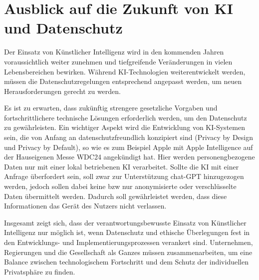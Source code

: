 \chapter{Ausblick auf die Zukunft von KI und Datenschutz}

Der Einsatz von Künstlicher Intelligenz wird in den kommenden Jahren
voraussichtlich weiter zunehmen und tiefgreifende Veränderungen in vielen
Lebensbereichen bewirken. Während KI-Technologien weiterentwickelt werden,
müssen die Datenschutzregelungen entsprechend angepasst werden, um neuen
Herausforderungen gerecht zu werden.

Es ist zu erwarten, dass zukünftig strengere gesetzliche Vorgaben und
fortschrittlichere technische Lösungen erforderlich werden, um den Datenschutz
zu gewährleisten. Ein wichtiger Aspekt wird die Entwicklung von KI-Systemen
sein, die von Anfang an datenschutzfreundlich konzipiert sind (Privacy by Design
und Privacy by Default), so wie es zum Beispiel Apple mit Apple Intelligence auf
der Hauseigenen Messe WDC24 angekündigt hat. Hier werden personengbezogene Daten
nur mit einer lokal betriebenen KI verarbeitet. Sollte die KI mit einer Anfrage
überfordert sein, soll zwar zur Unterstützung chat-GPT hinzugezogen werden,
jedoch sollen dabei keine bzw nur anonymisierte oder verschlüsselte Daten
übermittelt werden. Dadurch soll gewährleistet werden, dass diese Informationen
das Gerät des Nutzers nicht verlassen.

Insgesamt zeigt sich, dass der verantwortungsbewusste Einsatz von Künstlicher
Intelligenz nur möglich ist, wenn Datenschutz und ethische Überlegungen fest in
den Entwicklungs- und Implementierungsprozessen verankert sind. Unternehmen,
Regierungen und die Gesellschaft als Ganzes müssen zusammenarbeiten, um eine
Balance zwischen technologischem Fortschritt und dem Schutz der individuellen
Privatsphäre zu finden.

\cite{mindverse2024}
